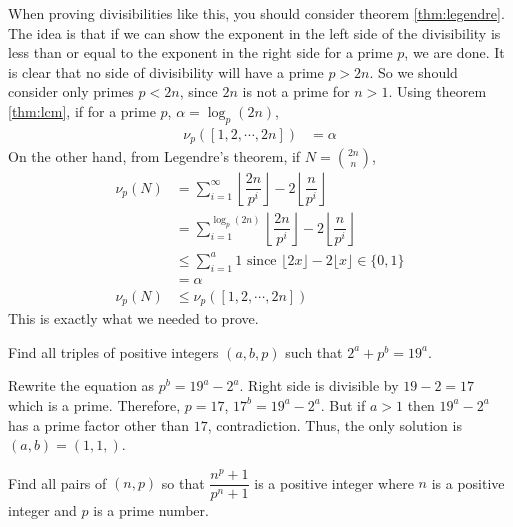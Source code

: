 \documentclass[problems.tex]{subfile}
\begin{document}
	\begin{solution}
		When proving divisibilities like this, you should consider theorem \eqref{thm:legendre}. The idea is that if we can show the exponent in the left side of the divisibility is less than or equal to the exponent in the right side for a prime $p$, we are done. It is clear that no side of divisibility will have a prime $p>2n$. So we should consider only primes $p<2n$, since $2n$ is not a prime for $n>1$. Using theorem \eqref{thm:lcm}, if for a prime $p$, $\alpha =\log_p(2n)$,
			\begin{align*}
				\nu_p([1,2,\cdots,2n]) & = \alpha
			\end{align*}
		On the other hand, from Legendre's theorem, if $N=\binom{2n}n$,
			\begin{align*}
				\nu_p(N) & = \sum_{i=1}^{\infty}\left\lfloor\dfrac{2n}{p^i}\right\rfloor-2\left\lfloor\dfrac{n}{p^i}\right\rfloor\\
						 & = \sum_{i=1}^{\log_{p}(2n)}\left\lfloor\dfrac{2n}{p^i}\right\rfloor-2\left\lfloor\dfrac{n}{p^i}\right\rfloor\\
						 &\leq\sum_{i=1}^{a}1\text { since }\lfloor2x\rfloor-2\lfloor x\rfloor\in\{0,1\}\\
						 & = \alpha \\
				\nu_p(N) &\leq\nu_p([1,2,\cdots,2n])
			\end{align*}
		This is exactly what we needed to prove.
	\end{solution}
	
	\begin{problem}
		Find all triples of positive integers $(a, b, p)$ such that $2^a+p^b=19^a$.
	\end{problem}
	
	\begin{solution}
		Rewrite the equation as $p^b=19^a-2^a$. Right side is divisible by $19-2=17$ which is a prime. Therefore, $p=17$, $17^b=19^a-2^a$. But if $a>1$ then $19^a-2^a$ has a prime factor other than $17$, contradiction. Thus, the only solution is $(a,b)=(1,1,)$.
	\end{solution}
	
	
	\begin{problem}
		Find all pairs of $(n, p)$ so that $\dfrac{n^p+1}{p^n+1}$ is a positive integer where $n$ is a positive integer and $p$ is a prime number.
	\end{problem}
	
\end{document}
